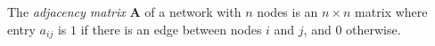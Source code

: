 \documentclass[
    preview, 
    varwidth = 8cm, 
    border = {2pt 0pt 0pt 0pt}
    ]{standalone} %
\begin{document}



The \emph{adjacency matrix} \(\bm{A}\) of a network with \(n\) nodes is an \(n\times n\) matrix 
where entry \(a_{ij}\) is \(1\) if there is an edge between nodes \(i\) and \(j\), and \(0\) otherwise.
\end{document}
